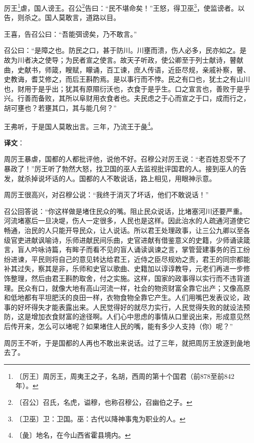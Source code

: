 \documentclass[12pt,UTF-8,openany]{ctexbook}
\begin{document}
\begin{normalsize}
    
    厉王\footnote{〔厉王〕周厉王，周夷王之子，名胡，西周的第十个国君（前878至前842年）。}虐，国人谤王。召公\footnote{〔召公〕召氏，名虎，谥穆，也称召穆公，召幽伯之子。}告曰：“民不堪命矣！”王怒，得卫巫\footnote{〔卫巫〕卫：卫国。巫：古代以降神事鬼为职业的人。}，使监谤者。以告，则杀之。国人莫敢言，道路以目。
    
    王喜，告召公曰：“吾能弭谤矣，乃不敢言。”
    
    召公曰：“是障之也。防民之口，甚于防川。川壅而溃，伤人必多，民亦如之。是故为川者决之使导；为民者宣之使言。故天子听政，使公卿至于列士献诗，瞽献曲，史献书，师箴，瞍赋，矇诵，百工谏，庶人传语，近臣尽规，亲戚补察，瞽、史教诲，耆艾修之，而后王斟酌焉。是以事行而不悖。民之有口也，犹土之有山川也，财用于是乎出；犹其有原隰衍沃也，衣食于是乎生。口之宣言也，善败于是乎兴。行善而备败，其所以阜财用衣食者也。夫民虑之于心而宣之于口，成而行之，胡可壅也？若壅其口，其与能几何？”
    
    王弗听，于是国人莫敢出言。三年，乃流王于彘\footnote{〔彘〕地名，在今山西省霍县境内。}。
\end{normalsize}


\newpage

\textbf{译文}：

\vspace{1em}

\begin{normalsize}
    
    周厉王暴虐，国都的人都批评他，说他不好。召穆公对厉王说：“老百姓忍受不了暴政了！”厉王听了勃然大怒，找卫国的巫人去监视批评国君的人。接到巫人的告发，就杀掉说坏话的人。国都的人不敢说话，路上相见，用眼神示意。
    
    周厉王很高兴，对召穆公说：“我终于消灭了坏话，他们不敢说话！”
    
    召公回答说：“你这样做是堵住民众的嘴。阻止民众说话，比堵塞河川还要严重。河流堵塞后一旦决堤，伤人一定很多，人民也是这样。因此治水的人疏通河道使它畅通，治民的人只能开导民众，让人说话。所以君王处理政事，让三公九卿以至各级官吏进献讽喻诗，乐师进献民间乐曲，史官进献有借鉴意义的史籍，少师诵读箴言，盲人吟咏诗篇，有眸子而看不见的盲人诵读讽谏之言，掌管营建事务的百工纷纷进谏，平民则将自己的意见转达给君王，近侍之臣尽规劝之责，君王的同宗都能补其过失，察其是非，乐师和史官以歌曲、史籍加以谆谆教导，元老们再进一步修饰整理，然后由君王斟酌取舍，付之实施。这样，国家的政事得以实行而不违背道理。民众有口，就像大地有高山河流一样，社会的物资财富全靠它出产；又像高原和低地都有平坦肥沃的良田一样，衣物食物全靠它产生。人们用嘴巴发表议论，政事的好坏得失才能表露出来。人民觉得好的就尽力实行，人民觉得失败的就设法预防，这是增加衣食财富的途径啊。人们心中思虑的事情从口里说出来，形成意见然后传开来，怎么可以堵呢？如果堵住人民的嘴，能有多少人支持（你）呢？”
    
    周厉王不听，于是国都的人再也不敢出来说话。过了三年，就把周厉王放逐到彘地去了。
    
\end{normalsize}
\end{document}
